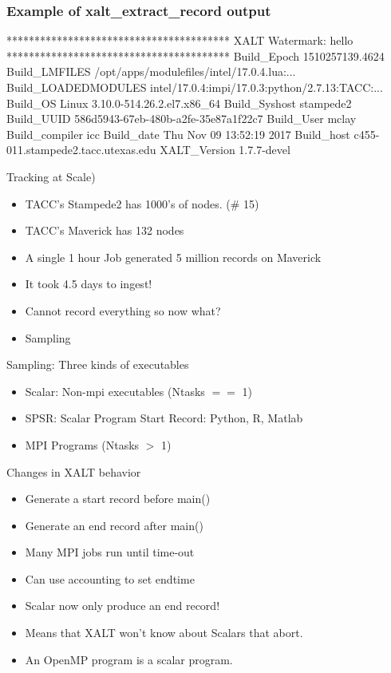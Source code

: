 \documentclass{beamer}
\begin{document}
\begin{frame}[fragile]
    \frametitle{Example of xalt\_extract\_record output}
 {\tiny
    \begin{semiverbatim}
****************************************
XALT Watermark: hello
****************************************
Build_Epoch              1510257139.4624
Build_LMFILES            /opt/apps/modulefiles/intel/17.0.4.lua:...
Build_LOADEDMODULES      intel/17.0.4:impi/17.0.3:python/2.7.13:TACC:...
Build_OS                 Linux 3.10.0-514.26.2.el7.x86_64
Build_Syshost            stampede2
Build_UUID               586d5943-67eb-480b-a2fe-35e87a1f22c7
Build_User               mclay
Build_compiler           icc
Build_date               Thu Nov 09 13:52:19 2017
Build_host               c455-011.stampede2.tacc.utexas.edu
XALT_Version             1.7.7-devel
    \end{semiverbatim}
}
\end{frame}


\begin{frame}{Tracking at Scale)}
  \begin{itemize}
    \item TACC's Stampede2 has 1000's of nodes. (\# 15)
    \item TACC's Maverick has 132 nodes
    \item A single 1 hour Job generated 5 million records on Maverick
    \item It took 4.5 days to ingest!
    \item Cannot record everything so now what?
    \item Sampling
  \end{itemize}
\end{frame}


\begin{frame}{Sampling: Three kinds of executables}
  \begin{itemize}
    \item Scalar: Non-mpi executables (Ntasks $==$ 1)
    \item SPSR: Scalar Program Start Record: Python, R, Matlab
    \item MPI Programs (Ntasks $>$ 1)
  \end{itemize}
\end{frame}

\begin{frame}{Changes in XALT behavior}
  \begin{itemize}
    \item Generate a start record before main()
    \item Generate an end record after main()
    \item Many MPI jobs run until time-out
    \item Can use accounting to set endtime
    \item Scalar now only produce an end record!
    \item Means that XALT won't know about Scalars that abort.
    \item An OpenMP program is a scalar program.
  \end{itemize}
\end{frame}
\end{document}
